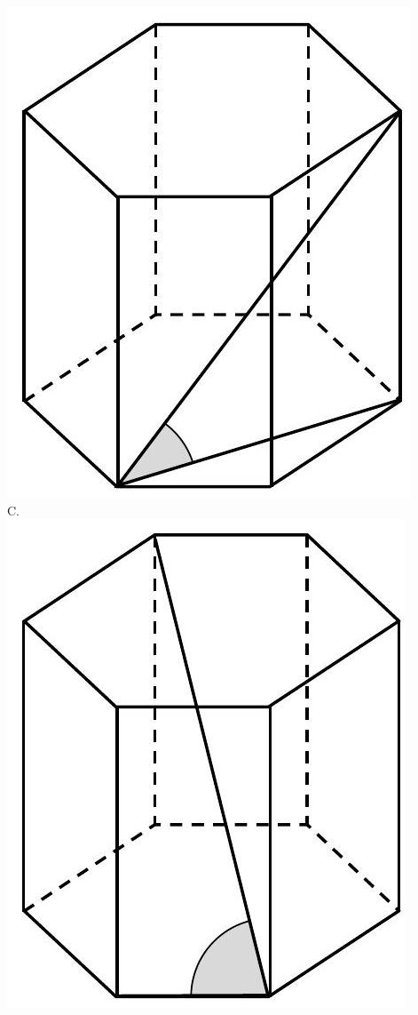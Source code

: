 \documentclass[10pt]{article}
\begin{document}
\includegraphics[max width=\textwidth, center]{2024_11_21_0a35d272448d5080a489g-20(1)}\\
C.\\
\includegraphics[max width=\textwidth, center]{2024_11_21_0a35d272448d5080a489g-20}\\
\end{document}
